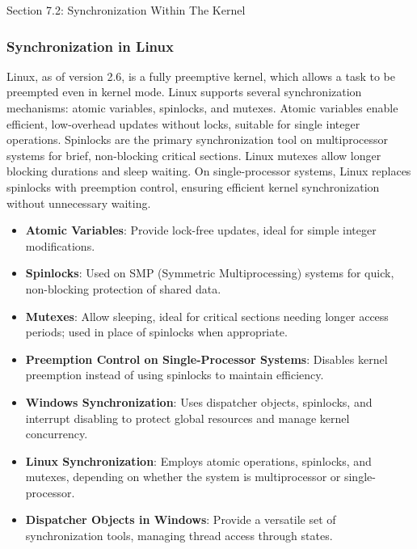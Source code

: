 \begin{notes}{Section 7.2: Synchronization Within The Kernel}
\begin{highlight}
    \end{highlight}
    
    \subsubsection*{Synchronization in Linux}
    
    Linux, as of version 2.6, is a fully preemptive kernel, which allows a task to be preempted even in kernel mode. Linux supports several synchronization mechanisms: atomic variables, spinlocks, 
    and mutexes. Atomic variables enable efficient, low-overhead updates without locks, suitable for single integer operations. Spinlocks are the primary synchronization tool on multiprocessor systems 
    for brief, non-blocking critical sections. Linux mutexes allow longer blocking durations and sleep waiting. On single-processor systems, Linux replaces spinlocks with preemption control, ensuring 
    efficient kernel synchronization without unnecessary waiting.
    
    \begin{highlight}
    
        \begin{itemize}
            \item \textbf{Atomic Variables}: Provide lock-free updates, ideal for simple integer modifications.
            \item \textbf{Spinlocks}: Used on SMP (Symmetric Multiprocessing) systems for quick, non-blocking protection of shared data.
            \item \textbf{Mutexes}: Allow sleeping, ideal for critical sections needing longer access periods; used in place of spinlocks when appropriate.
            \item \textbf{Preemption Control on Single-Processor Systems}: Disables kernel preemption instead of using spinlocks to maintain efficiency.
        \end{itemize}
    
    \end{highlight}
    
    \begin{highlight}
    
        \begin{itemize}
            \item \textbf{Windows Synchronization}: Uses dispatcher objects, spinlocks, and interrupt disabling to protect global resources and manage kernel concurrency.
            \item \textbf{Linux Synchronization}: Employs atomic operations, spinlocks, and mutexes, depending on whether the system is multiprocessor or single-processor.
            \item \textbf{Dispatcher Objects in Windows}: Provide a versatile set of synchronization tools, managing thread access through states.
        \end{itemize}
    

\end{highlight}
\end{notes}
